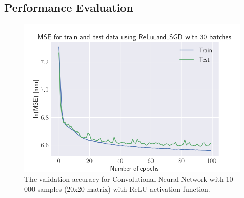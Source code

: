 \documentclass[a4paper, UKenglish, 11pt]{uiomaster}
\begin{document}
\subsection{Performance Evaluation}

\begin{figure}[!htb]
    \centering
    \includegraphics[width=\linewidth]{../Code/plots/finals/MSE_CNN_dipoles_2_interpolated_CNN_20x20_10000_ReLu_and_SGD_30_100.png}
    \caption{The validation accuracy for Convolutional Neural Network with 10 000 samples (20x20 matrix) with ReLU activation function. }
    \label{fig:single_dipole_accuracy_CNN_2d}
\end{figure}

\end{document}
